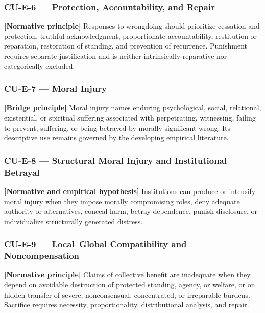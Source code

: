 \documentclass[
  11pt,
]{article}
\begin{document}
\subsubsection{CU-E-6 --- Protection, Accountability, and
Repair}\label{cu-e-6-protection-accountability-and-repair}

\textbf{{[}Normative principle{]}} Responses to wrongdoing should
prioritize cessation and protection, truthful acknowledgment,
proportionate accountability, restitution or reparation, restoration of
standing, and prevention of recurrence. Punishment requires separate
justification and is neither intrinsically reparative nor categorically
excluded.

\subsubsection{CU-E-7 --- Moral Injury}\label{cu-e-7-moral-injury}

\textbf{{[}Bridge principle{]}} Moral injury names enduring
psychological, social, relational, existential, or spiritual suffering
associated with perpetrating, witnessing, failing to prevent, suffering,
or being betrayed by morally significant wrong. Its descriptive use
remains governed by the developing empirical literature.

\subsubsection{CU-E-8 --- Structural Moral Injury and Institutional
Betrayal}\label{cu-e-8-structural-moral-injury-and-institutional-betrayal}

\textbf{{[}Normative and empirical hypothesis{]}} Institutions can
produce or intensify moral injury when they impose morally compromising
roles, deny adequate authority or alternatives, conceal harm, betray
dependence, punish disclosure, or individualize structurally generated
distress.

\subsubsection{CU-E-9 --- Local--Global Compatibility and
Noncompensation}\label{cu-e-9-localglobal-compatibility-and-noncompensation}

\textbf{{[}Normative principle{]}} Claims of collective benefit are
inadequate when they depend on avoidable destruction of protected
standing, agency, or welfare, or on hidden transfer of severe,
nonconsensual, concentrated, or irreparable burdens. Sacrifice requires
necessity, proportionality, distributional analysis, and repair.
\end{document}
